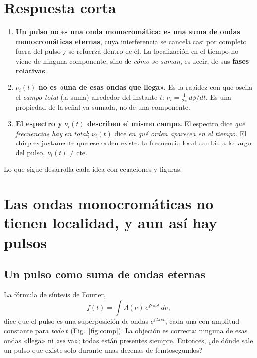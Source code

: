 \documentclass[11pt]{article}
\newcommand{\jj}{\mathrm{j}}
\begin{document}
\section{Respuesta corta}
\begin{clave}[title={Tres ideas}]
\begin{enumerate}[leftmargin=1.6em]
\item \textbf{Un pulso no es una onda monocromática: es una suma de ondas monocromáticas eternas}, cuya interferencia se cancela casi por completo fuera del pulso y se refuerza dentro de él. La localización en el tiempo no viene de ninguna componente, sino de \emph{cómo se suman}, es decir, de sus \textbf{fases relativas}.
\item \textbf{$\nu_i(t)$ no es «una de esas ondas que llega».} Es la rapidez con que oscila el \emph{campo total} (la suma) alrededor del instante $t$: $\nu_i=\frac{1}{2\pi}\,d\phi/dt$. Es una propiedad de la señal ya sumada, no de una componente.
\item \textbf{El espectro y $\nu_i(t)$ describen el mismo campo.} El espectro dice \emph{qué frecuencias hay en total}; $\nu_i(t)$ dice \emph{en qué orden aparecen en el tiempo}. El chirp es justamente que ese orden existe: la frecuencia local cambia a lo largo del pulso, $\nu_i(t)\neq\text{cte}$.
\end{enumerate}
\end{clave}

Lo que sigue desarrolla cada idea con ecuaciones y figuras.

\section{Las ondas monocromáticas no tienen localidad, y aun así hay pulsos}
\subsection{Un pulso como suma de ondas eternas}
La fórmula de síntesis de Fourier,
\[
f(t)=\int\tilde A(\nu)\,e^{\jj2\pi\nu t}\,d\nu,
\]
dice que el pulso es una superposición de ondas $e^{\jj2\pi\nu t}$, cada una con amplitud constante para \emph{todo} $t$ (Fig.~\ref{fig:comp}). La objeción es correcta: ninguna de esas ondas «llega» ni «se va»; todas están presentes siempre. Entonces, ¿de dónde sale un pulso que existe solo durante unas decenas de femtosegundos?
\end{document}
